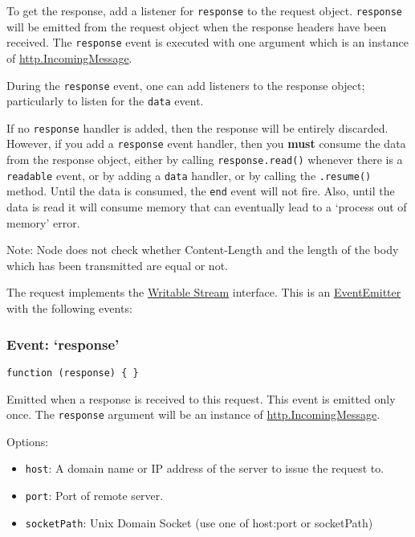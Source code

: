 To get the response, add a listener for
\texttt{\textquotesingle{}response\textquotesingle{}} to the request
object. \texttt{\textquotesingle{}response\textquotesingle{}} will be
emitted from the request object when the response headers have been
received. The \texttt{\textquotesingle{}response\textquotesingle{}}
event is executed with one argument which is an instance of
\hyperref[httpux5fhttpux5fincomingmessage]{http.IncomingMessage}.

During the \texttt{\textquotesingle{}response\textquotesingle{}} event,
one can add listeners to the response object; particularly to listen for
the \texttt{\textquotesingle{}data\textquotesingle{}} event.

If no \texttt{\textquotesingle{}response\textquotesingle{}} handler is
added, then the response will be entirely discarded. However, if you add
a \texttt{\textquotesingle{}response\textquotesingle{}} event handler,
then you \textbf{must} consume the data from the response object, either
by calling \texttt{response.read()} whenever there is a
\texttt{\textquotesingle{}readable\textquotesingle{}} event, or by
adding a \texttt{\textquotesingle{}data\textquotesingle{}} handler, or
by calling the \texttt{.resume()} method. Until the data is consumed,
the \texttt{\textquotesingle{}end\textquotesingle{}} event will not
fire. Also, until the data is read it will consume memory that can
eventually lead to a `process out of memory' error.

Note: Node does not check whether Content-Length and the length of the
body which has been transmitted are equal or not.

The request implements the
\href{stream.html\#stream_class_stream_writable}{Writable Stream}
interface. This is an
\href{events.html\#events_class_events_eventemitter}{EventEmitter} with
the following events:

\subsubsection{\texorpdfstring{Event:
`response'}{Event: response}}\label{event-response}

\texttt{function\ (response)\ \{\ \}}

Emitted when a response is received to this request. This event is
emitted only once. The \texttt{response} argument will be an instance of
\hyperref[httpux5fhttpux5fincomingmessage]{http.IncomingMessage}.

Options:

\begin{itemize}
\itemsep1pt\parskip0pt
\item
  \texttt{host}: A domain name or IP address of the server to issue the
  request to.
\item
  \texttt{port}: Port of remote server.
\item
  \texttt{socketPath}: Unix Domain Socket (use one of host:port or
  socketPath)
\end{itemize}

